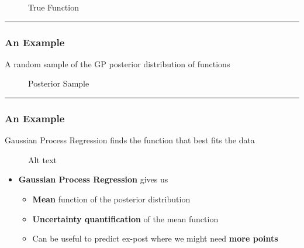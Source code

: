 \documentclass[
  letterpaper,
  DIV=11,
  numbers=noendperiod]{scrartcl}
\providecommand{\tightlist}{%
  \setlength{\itemsep}{0pt}\setlength{\parskip}{0pt}}\usepackage{longtable,booktabs,array}
\begin{document}
\begin{figure}

{\centering 

}

\caption{True Function}

\end{figure}

\begin{center}\rule{0.5\linewidth}{0.5pt}\end{center}

\hypertarget{an-example-1}{%
\subsubsection{An Example}\label{an-example-1}}

A random sample of the GP posterior distribution of functions

\begin{figure}

{\centering 

}

\caption{Posterior Sample}

\end{figure}

\begin{center}\rule{0.5\linewidth}{0.5pt}\end{center}

\hypertarget{an-example-2}{%
\subsubsection{An Example}\label{an-example-2}}

Gaussian Process Regression finds the function that best fits the data

\begin{figure}

{\centering 

}

\caption{Alt text}

\end{figure}

\begin{itemize}
\tightlist
\item
  \textbf{Gaussian Process Regression} gives us

  \begin{itemize}
  \tightlist
  \item
    \textbf{Mean} function of the posterior distribution
  \item
    \textbf{Uncertainty quantification} of the mean function
  \item
    Can be useful to predict ex-post where we might need \textbf{more
    points}
  \end{itemize}
\end{itemize}
\end{document}
